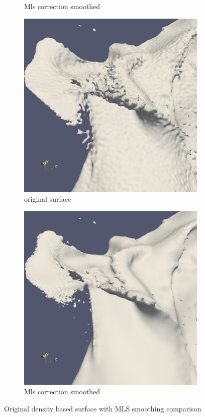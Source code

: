 \begin{figure}
\begin{center}
\begin{subfigure}[b]{0.47\textwidth}
			\caption{Mls correction smoothed}
		\end{subfigure}
		\begin{subfigure}[b]{0.47\textwidth}
			\includegraphics[width=\textwidth]{figures/CanionOriginal2.png}
			\caption{original surface}
		\end{subfigure}
		\begin{subfigure}[b]{0.47\textwidth}
			\includegraphics[width=\textwidth]{figures/CanionMls2.png}
			\caption{Mls correction smoothed}
		\end{subfigure}
	\end{center}
	\caption{Original density based surface with MLS smoothing comparison} \label{fig:db_mls_reconstruction3}
\end{figure}
